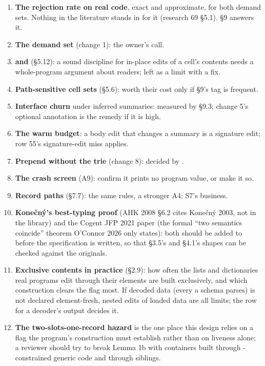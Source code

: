 \begin{enumerate}
\item \textbf{The rejection rate on real code}, exact and approximate, for both demand sets. Nothing in the literature stands in for it (research 69 §5.1). §9 answers it.
\item \textbf{The demand set} (change 1): the owner's call.
\item \textbf{ and } (§5.12): a sound discipline for in-place edits of a cell's contents needs a whole-program argument about readers; left as a limit with a  fix.
\item \textbf{Path-sensitive cell sets} (§5.6): worth their cost only if §9's  tag is frequent.
\item \textbf{Interface churn} under inferred summaries: measured by §9.3; change 5's optional annotation is the remedy if it is high.
\item \textbf{The warm budget}: a body edit that changes a summary is a signature edit;  row 55's signature-edit miss applies.
\item \textbf{Prepend without the trie} (change 8): decided by .
\item \textbf{The crash screen} (A9): confirm it prints no program value, or make it so.
\item \textbf{Record paths} (§7.7): the same rules, a stronger A4; S7's business.
\item \textbf{Konečný's best-typing proof} (AHK 2008 §6.2 cites Konečný 2003, not in the library) and the Cogent JFP 2021 paper (the formal “two semantics coincide” theorem O'Connor 2026 only states): both should be added to  before the specification is written, so that §3.5's and §4.1's shapes can be checked against the originals.
\item \textbf{Exclusive contents in practice} (§2.9): how often the lists and dictionaries real programs edit through their elements are built exclusively, and which construction clears the flag most. If decoded data (every  a schema parses) is not declared element-fresh, nested edits of loaded data are all limits; the row for a decoder's output decides it.
\item \textbf{The two-slots-one-record hazard} is the one place this design relies on a flag the program's construction must establish rather than on liveness alone; a reviewer should try to break Lemma 1b with containers built through -constrained generic code and through  siblings.

\end{enumerate}
